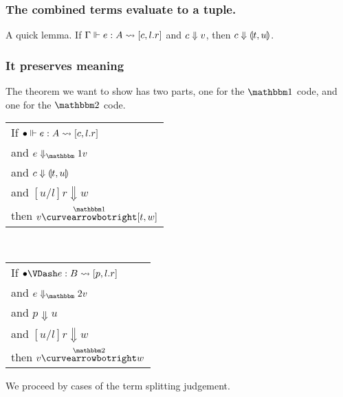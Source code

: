 \documentclass{article}
\begin{document}
\subsubsection{The combined terms evaluate to a tuple.}

A quick lemma.  If $\splitone{e}{A}{c,l.r}$ and $\reduce{c}{v}$, then $\reduce{c}{\valprod{t}{u}}$.

\subsubsection{It preserves meaning}

The theorem we want to show has two parts, one for the $\bbone$ code, and one for the $\bbtwo$ code.  
\begin{center}
\begin{tabular}{l}
If $\splitone [\emptyC]{e}{A}{c,l.r}$ \\
and $\reduceone{e}{v}$ \\
and $c \Downarrow \valprod{t}{u}$ \\
and $[u/l]r \Downarrow w$ \\
then $v \vsplito [t,w]$
\end{tabular}
~~~
\begin{tabular}{l}
If $\splittwo[\emptyC]{e}{B}{p,l.r}$ \\
and $\reducetwo{e}{v}$ \\
and $p \Downarrow u$ \\
and $[u/l]r \Downarrow w$ \\
then $v \vsplits w$
\end{tabular}
\end{center}

We proceed by cases of the term splitting judgement.
\end{document}
